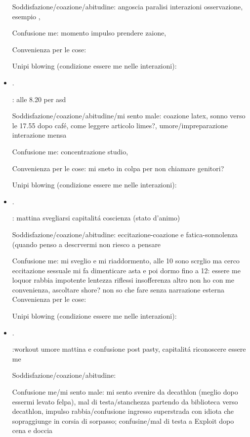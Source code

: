 \begin{itemize}
Soddisfazione/coazione/abitudine: angoscia paralisi interazioni osservazione, esempio , 

Confusione me: momento impulso prendere zaione, 

Convenienza per le cose:

Unipi blowing (condizione essere me nelle interazioni):

\item {}.

: alle 8.20 per asd

Soddisfazione/coazione/abitudine/mi sento male: coazione latex, sonno verso le 17.55 dopo caf\'e, come leggere articolo limes?, umore/impreparazione interazione mensa

Confusione me: concentrazione studio, 

Convenienza per le cose: mi sneto in colpa per non chiamare genitori?

Unipi blowing (condizione essere me nelle interazioni):

\item {}.

: mattina svegliarsi capitalit\'a coscienza (stato d'animo)

Soddisfazione/coazione/abitudine: eccitazione-coazione e fatica-sonnolenza (quando penso a descrvermi non riesco a pensare

Confusione me:
mi sveglio e mi riaddormento, alle 10 sono scrglio ma cerco eccitazione sessuale mi fa dimenticare asta e poi dormo fino a 12:  essere me loquor rabbia impotente lentezza riflessi insofferenza altro
non ho con me convenienza, ascoltare shore?
non so che fare senza narrazione esterna
Convenienza per le cose: 

Unipi blowing (condizione essere me nelle interazioni):

\item {}.

:workout umore mattina e confusione post pasty, capitalit\'a riconoscere essere me

Soddisfazione/coazione/abitudine:

Confusione me/mi sento male: mi sento svenire da decathlon (meglio dopo essermi levato felpa), mal di testa/stanchezza partendo da biblioteca verso decathlon, impulso rabbia/confusione ingresso superstrada con idiota che sopraggiunge in corsia di sorpasso; confusine/mal di testa a Exploit dopo cena e doccia


\end{itemize}
